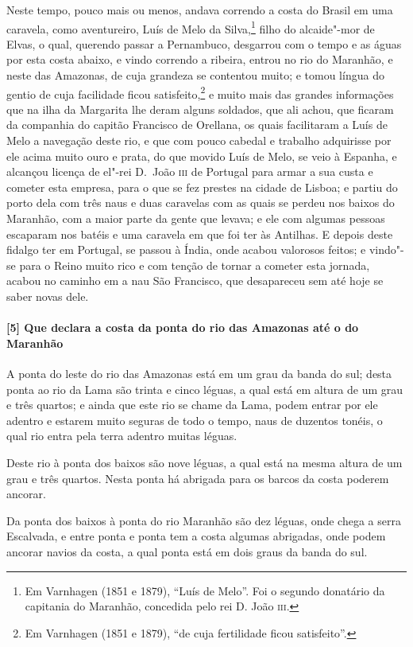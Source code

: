 \begin{linenumbers}
Neste tempo, pouco mais ou menos, andava correndo a costa do Brasil em uma caravela, como
aventureiro, Luís de Melo da Silva,\footnote{ Em Varnhagen (1851 e 1879), ``Luís de Melo''.
Foi o segundo donatário da capitania do Maranhão, concedida pelo rei D. João
\textsc{iii}.} filho do alcaide"-mor de Elvas, o qual, querendo passar a Pernambuco,
desgarrou com o tempo e as águas por esta costa abaixo, e vindo correndo a ribeira, entrou
no rio do Maranhão, e neste das Amazonas, de cuja grandeza se contentou muito; e tomou
língua do gentio de cuja facilidade ficou satisfeito,\footnote{ Em Varnhagen (1851 e
1879), ``de cuja fertilidade ficou satisfeito''.} e muito mais das grandes informações que
na ilha da Margarita lhe deram alguns soldados, que ali achou, que ficaram da companhia do
capitão Francisco de Orellana, os quais facilitaram a Luís de Melo a navegação deste rio,
e que com pouco cabedal e trabalho adquirisse por ele acima muito ouro e prata, do que
movido Luís de Melo, se veio à Espanha, e alcançou licença de el"-rei D.~João \textsc{iii}
de Portugal para armar a sua custa e cometer esta empresa, para o que se fez prestes na
cidade de Lisboa; e partiu do porto dela com três naus e duas caravelas com as quais se
perdeu nos baixos do Maranhão, com a maior parte da gente que levava; e ele com algumas
pessoas escaparam nos batéis e uma caravela em que foi ter às Antilhas. E depois deste
fidalgo ter em Portugal, se passou à Índia, onde acabou valorosos feitos; e vindo"-se para
o Reino muito rico e com tenção de tornar a cometer esta jornada, acabou no caminho em a
nau São Francisco, que desapareceu sem até hoje se saber novas dele.

\paragraph{[5] Que declara a costa da ponta do rio das Amazonas até o do Maranhão} \quad
A ponta do leste do rio das Amazonas está em um grau da banda do sul; desta ponta ao rio
da Lama são trinta e cinco léguas, a qual está em altura de um grau e três quartos; e
ainda que este rio se chame da Lama, podem entrar por ele adentro e estarem muito seguras
de todo o tempo, naus de duzentos tonéis, o qual rio entra pela terra adentro muitas
léguas.

Deste rio à ponta dos baixos são nove léguas, a qual está na mesma altura de um grau e
três quartos. Nesta ponta há abrigada para os barcos da costa poderem ancorar.

Da ponta dos baixos à ponta do rio Maranhão são dez léguas, onde chega a serra Escalvada,
e entre ponta e ponta tem a costa algumas abrigadas, onde podem ancorar navios da costa, a
qual ponta está em dois graus da banda do sul.


\end{linenumbers}
